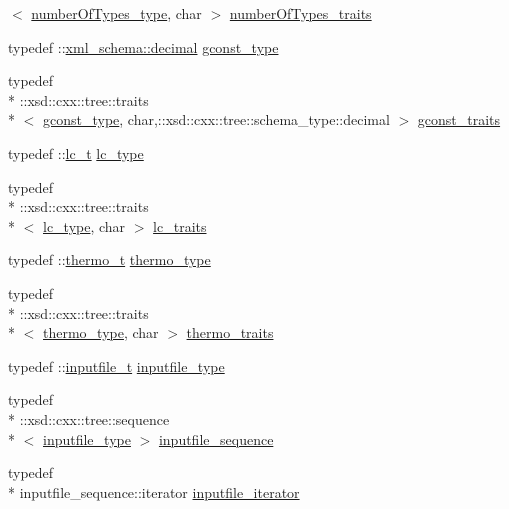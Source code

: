 \begin{DoxyCompactItemize}
$<$ \hyperlink{classpse__t_a3aa6a8cc1b9642304371fb935f6e1965}{number\-Of\-Types\-\_\-type}, char $>$ \hyperlink{classpse__t_af86f3cfbbdef30f8a4a5927642e947bf}{number\-Of\-Types\-\_\-traits}
\item 
typedef \-::\hyperlink{namespacexml__schema_a69bfaf24f63a8c18ebd8e21db6b343df}{xml\-\_\-schema\-::decimal} \hyperlink{classpse__t_a86b52d56dfb0c43a023d8bda8b4a19ed}{gconst\-\_\-type}
\item 
typedef \\*
\-::xsd\-::cxx\-::tree\-::traits\\*
$<$ \hyperlink{classpse__t_a86b52d56dfb0c43a023d8bda8b4a19ed}{gconst\-\_\-type}, char,\-::xsd\-::cxx\-::tree\-::schema\-\_\-type\-::decimal $>$ \hyperlink{classpse__t_a9074dfb701a5e94c508dda07a4afe61b}{gconst\-\_\-traits}
\item 
typedef \-::\hyperlink{classlc__t}{lc\-\_\-t} \hyperlink{classpse__t_aa6a9bda12a405c1b9fb0baecbed9a1bb}{lc\-\_\-type}
\item 
typedef \\*
\-::xsd\-::cxx\-::tree\-::traits\\*
$<$ \hyperlink{classpse__t_aa6a9bda12a405c1b9fb0baecbed9a1bb}{lc\-\_\-type}, char $>$ \hyperlink{classpse__t_a3e552e037801ee7f00dbfb46a0a860f6}{lc\-\_\-traits}
\item 
typedef \-::\hyperlink{classthermo__t}{thermo\-\_\-t} \hyperlink{classpse__t_aebaae32f697fb451e7bab83078867d4e}{thermo\-\_\-type}
\item 
typedef \\*
\-::xsd\-::cxx\-::tree\-::traits\\*
$<$ \hyperlink{classpse__t_aebaae32f697fb451e7bab83078867d4e}{thermo\-\_\-type}, char $>$ \hyperlink{classpse__t_a3c730d4487efb386ba2d36da2bd1dbd0}{thermo\-\_\-traits}
\item 
typedef \-::\hyperlink{classinputfile__t}{inputfile\-\_\-t} \hyperlink{classpse__t_a86a1a849175762d6b2d8d254a694d43c}{inputfile\-\_\-type}
\item 
typedef \\*
\-::xsd\-::cxx\-::tree\-::sequence\\*
$<$ \hyperlink{classpse__t_a86a1a849175762d6b2d8d254a694d43c}{inputfile\-\_\-type} $>$ \hyperlink{classpse__t_a4256607256aa600165964a3a6d7b4a00}{inputfile\-\_\-sequence}
\item 
typedef \\*
inputfile\-\_\-sequence\-::iterator \hyperlink{classpse__t_a18cbe2015326033fa7dc6f53112daa5f}{inputfile\-\_\-iterator}
\item 

\end{DoxyCompactItemize}
